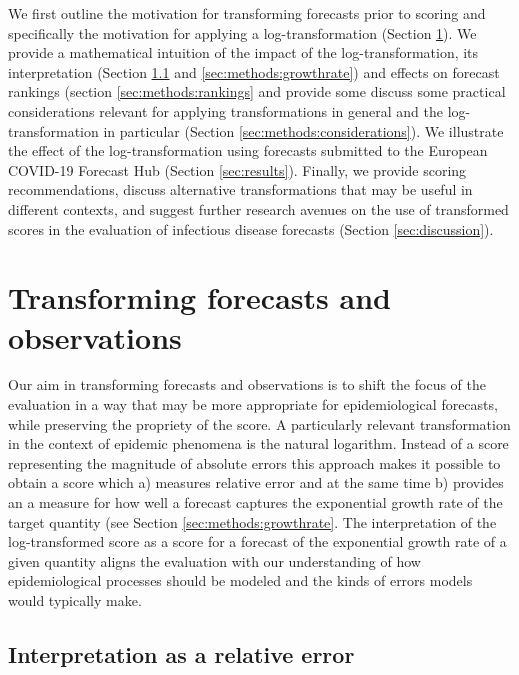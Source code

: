 \documentclass{article}
\begin{document}
We first outline the motivation for transforming forecasts prior to scoring and specifically the motivation for applying a log-transformation (Section \ref{sec:methods}). We provide a mathematical intuition of the impact of the log-transformation, its interpretation (Section \ref{sec:methods:relative} and \ref{sec:methods:growthrate}) and effects on forecast rankings (section \ref{sec:methods:rankings} and provide some discuss some practical considerations relevant for applying transformations in general and the log-transformation in particular (Section \ref{sec:methods:considerations}). We illustrate the effect of the log-transformation using forecasts submitted to the European COVID-19 Forecast Hub  \citep{europeancovid-19forecasthubEuropeanCovid19Forecast2021, sherrattPredictivePerformanceMultimodel2022} (Section \ref{sec:results}). Finally, we provide scoring recommendations, discuss alternative transformations that may be useful in different contexts, and suggest further research avenues on the use of transformed scores in the evaluation of infectious disease forecasts (Section \ref{sec:discussion}). 


\section{Transforming forecasts and observations}
\label{sec:methods}

Our aim in transforming forecasts and observations is to shift the focus of the evaluation in a way that may be more appropriate for epidemiological forecasts, while preserving the propriety of the score. A particularly relevant transformation in the context of epidemic phenomena is the natural logarithm. Instead of a score representing the magnitude of absolute errors this approach makes it possible to obtain a score which a) measures relative error and at the same time b) provides an a measure for how well a forecast captures the exponential growth rate of the target quantity (see Section \ref{sec:methods:growthrate}. The interpretation of the log-transformed score as a score for a forecast of the exponential growth rate of a given quantity aligns the evaluation with our understanding of how epidemiological processes should be modeled and the kinds of errors models would typically make. 


\subsection{Interpretation as a relative error}
\label{sec:methods:relative}
\end{document}
